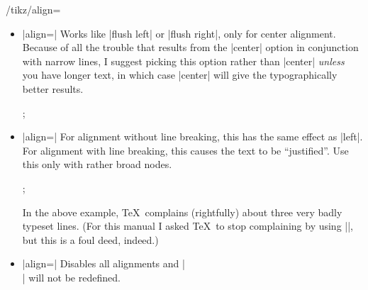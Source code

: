 \begin{key}{/tikz/align=}
\begin{itemize}
            There is one annoying problem with the |center| alignment (but not
            with |flush center| and the other options): If you specify a large
            line width and the node text fits on a single line and is, in fact,
            much shorter than the specified |text width|, an underfull
            horizontal box will result. Unfortunately, this cannot be avoided,
            due to the way \TeX\ works (more precisely, I have thought long and
            hard about this and have not been able to figure out a sensible way
            to avoid this). For this reason, \tikzname\ switches off horizontal
            badness warnings inside boxes with |align=center|. Since this will
            also suppress some ``wanted'' warnings, there is also an option for
            switching the warnings on once more:
            \begin{key}{/tikz/badness warnings for centered text= (initially false)}
                If set to true, normal badness warnings will be issued for
                centered boxes. Note that you may get annoying warnings for
                perfectly normal boxes, namely whenever the box is very large
                and the contents is not long enough to fill the box
                sufficiently.
            \end{key}
        \item |align=|  Works like |flush left|
            or |flush right|, only for center alignment. Because of all the
            trouble that results from the |center| option in conjunction with
            narrow lines, I suggest picking this option rather than  |center|
            \emph{unless} you have longer text, in which case |center| will
            give the typographically better results.
\begin{codeexample}[]
\tikz {};
\end{codeexample}
        \item |align=| For alignment without line breaking,
            this has the same effect as |left|. For alignment with line
            breaking, this causes the text to be ``justified''. Use this only
            with rather broad nodes.
{%
\begin{codeexample}[]
\tikz {};
\end{codeexample}
}
            In the above example, \TeX\ complains (rightfully) about three very
            badly typeset lines. (For this manual I asked \TeX\ to stop
            complaining by using ||, but this is a foul deed,
            indeed.)
        \item |align=| Disables all alignments and |\\| will
            not be redefined.
    \end{itemize}
\end{key}

